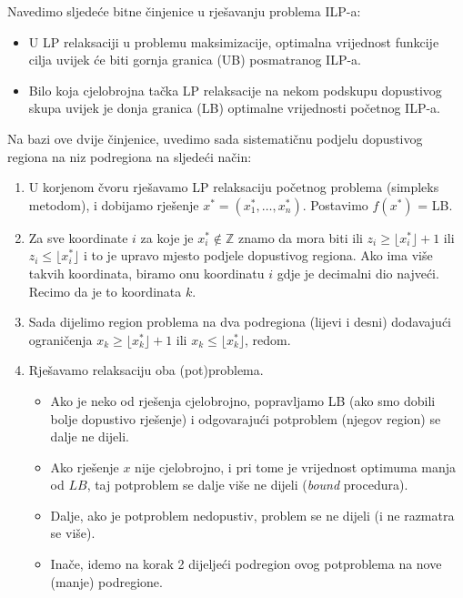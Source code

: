 \documentclass[a4paper, utf8, 11pt, colorlinks]{article}
\begin{document}
Navedimo sljedeće bitne činjenice u rješavanju problema  ILP-a:
\begin{itemize}
    \item  U LP relaksaciji u problemu 
           maksimizacije, optimalna vrijednost funkcije cilja 
           uvijek će biti gornja granica (UB) posmatranog ILP-a. 
    \item  Bilo koja cjelobrojna tačka LP relaksacije na nekom podskupu  
           dopustivog skupa uvijek je  donja granica (LB) optimalne vrijednosti početnog ILP-a. 
\end{itemize}
Na bazi ove dvije činjenice, uvedimo sada sistematičnu podjelu dopustivog regiona na niz podregiona na sljedeći način:
\begin{enumerate}
    \item U korjenom čvoru rješavamo LP relaksaciju početnog problema     (simpleks metodom), i dobijamo rješenje $x^*=(x^*_1, \ldots, x^*_n)$.   Postavimo $f(x^*)$ = LB.
    \item Za sve koordinate $i$ za koje je $x^*_i \not \in \mathbb{Z}$ znamo da  mora biti ili $z_i \geq \lfloor x^*_i \rfloor + 1$ ili $z_i \leq \lfloor x^*_i \rfloor$ i to je upravo mjesto podjele dopustivog regiona. Ako ima više takvih koordinata, biramo onu koordinatu $i$ gdje je decimalni dio najveći.  Recimo da je to koordinata $k$.
    \item Sada dijelimo region problema na dva podregiona (lijevi i desni) dodavajući 
          ograničenja $x_k \geq \lfloor x^*_k \rfloor + 1$ ili $x_k \leq \lfloor x^*_k \rfloor$, redom.
    \item Rješavamo relaksaciju oba (pot)problema. 
    \begin{itemize}
    	\item  Ako je neko od rješenja cjelobrojno, popravljamo LB (ako smo dobili bolje dopustivo rješenje) i odgovarajući potproblem (njegov region) se dalje ne dijeli. 
    	\item Ako rješenje $x$ nije cjelobrojno, i pri tome je vrijednost optimuma manja od $LB$, taj potproblem se dalje više ne dijeli (\emph{bound} procedura). 
    	\item Dalje, ako je potproblem nedopustiv, problem se ne dijeli (i ne razmatra se više). 
    	\item Inače, idemo na korak 2 dijeljeći podregion ovog potproblema na nove (manje) podregione.    
    \end{itemize}
\end{enumerate}
\end{document}
